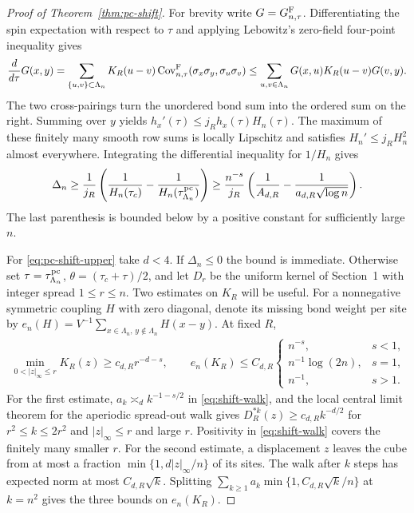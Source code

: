 \documentclass[11pt]{article}
\numberwithin{equation}{section}
\begin{document}
\begin{proof}[Proof of Theorem~\ref{thm:pc-shift}]
For brevity write $G=G_{n,\tau}^{\rm F}$. Differentiating the spin
expectation with respect to $\tau$ and applying Lebowitz's zero-field
four-point inequality \cite{lebowitz} gives
\begin{align}
 \frac{d}{d\tau}G(x,y)
 =\sum_{\{u,v\}\subset\Lambda_n} K_R(u-v)
      \operatorname{Cov}_{n,\tau}^{\rm F}(\sigma_x\sigma_y,\sigma_u\sigma_v)
 \le \sum_{u,v\in\Lambda_n} G(x,u)K_R(u-v)G(v,y).
\end{align}
The two cross-pairings turn the unordered bond sum into the ordered
sum on the right. Summing over $y$ yields
$h_x'(\tau)\le j_R h_x(\tau)H_n(\tau)$. The maximum of these finitely
many smooth row sums is locally Lipschitz and satisfies
$H_n'\le j_R H_n^2$ almost everywhere. Integrating the differential
inequality for $1/H_n$ gives
\begin{align}
 \Delta_n\ge \frac1{j_R}
 \left(\frac1{H_n(\tau_c)}-\frac1{H_n(\tau_{\Lambda_n}^{\rm pc})}\right)
 \ge \frac{n^{-s}}{j_R}
 \left(\frac1{A_{d,R}}-\frac1{a_{d,R}\sqrt{\log n}}\right).
\end{align}
The last parenthesis is bounded below by a positive constant for
sufficiently large $n$.

For \eqref{eq:pc-shift-upper} take $d<4$. If $\Delta_n\le0$ the bound
is immediate. Otherwise set $\tau=\tau_{\Lambda_n}^{\rm pc}$,
$\theta=(\tau_c+\tau)/2$, and let $D_r$ be the uniform kernel of
Section~1 with integer spread $1\le r\le n$.
Two estimates on $K_R$ will be useful. For a nonnegative symmetric
coupling $H$ with zero diagonal, denote its missing bond weight per site by
$e_n(H)=V^{-1}\sum_{x\in\Lambda_n,\,y\notin\Lambda_n}H(x-y)$.
At fixed $R$,
\begin{align}
 \min_{0<|z|_\infty\le r}K_R(z)\ge c_{d,R}r^{-d-s},
 \qquad e_n(K_R)\le C_{d,R}
 \begin{cases}
 n^{-s},&s<1,\\
 n^{-1}\log(2n),&s=1,\\
 n^{-1},&s>1 .
 \end{cases}
\end{align}
For the first estimate, $a_k\asymp_d k^{-1-s/2}$ in \eqref{eq:shift-walk},
and the local central limit theorem for the aperiodic spread-out walk
gives $D_R^{*k}(z)\ge c_{d,R}k^{-d/2}$ for $r^2\le k\le2r^2$ and
$|z|_\infty\le r$ and large $r$. Positivity in \eqref{eq:shift-walk}
covers the finitely many smaller $r$. For the second estimate, a displacement $z$ leaves
the cube from at most a fraction $\min\{1,d|z|_\infty/n\}$ of its sites.
The walk after $k$ steps has expected norm at most $C_{d,R}\sqrt{k}$.
Splitting $\sum_{k\ge1}a_k\min\{1,C_{d,R}\sqrt{k}/n\}$ at $k=n^2$
gives the three bounds on $e_n(K_R)$.


\end{proof}
\end{document}
